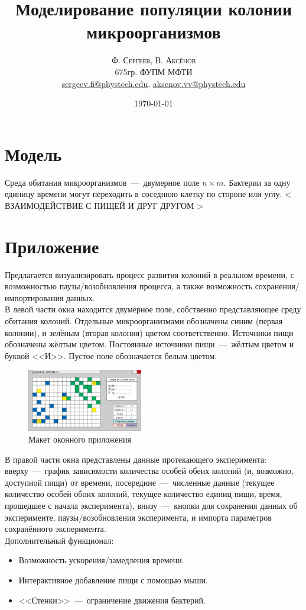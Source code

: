 \documentclass[11pt,twoside,twocolumn,russian,a4paper]{article}
\title{Моделирование популяции колонии микроорганизмов} %
\author{
	\textsc{Ф. Сергеев, В. Аксёнов} \\[0.5ex] %
	\normalsize 675гр. ФУПМ МФТИ \\ %
	\normalsize \href{mailto:sergeev.fi@phystech.edu}{sergeev.fi@phystech.edu}, \href{mailto:aksenov.vv@phystech.edu}{aksenov.vv@phystech.edu}	\normalsize 
}
\date{\today} %
\begin{document}
\maketitle


\section{Модель}

\noindent Среда обитания микроорганизмов~---~двумерное поле $n\times m$. Бактерии за одну единицу времени могут переходить в соседнюю клетку по стороне или углу.  <  ВЗАИМОДЕЙСТВИЕ С ПИЩЕЙ И ДРУГ ДРУГОМ >

\section{Приложение}

\noindent Предлагается визуализировать процесс развития колоний в реальном времени, с возможностью паузы/возобновления процесса, а также возможность сохранения/импортирования данных. \smallskip\\
\noindent В левой части окна находится двумерное поле, собственно представляющее среду обитания колоний. Отдельные микроорганизмами обозначены синим (первая колонии), и зелёным (вторая колония) цветом соответственно. Источники пищи обозначены жёлтым цветом. Постоянные источники пищи~---~жёлтым цветом и буквой <<И>>. Пустое поле обозначается белым цветом.\smallskip

\begin{figure}[h]
	\centering
	\includegraphics[width=0.45\textwidth]{scheme_big}
	\caption{Макет оконного приложения}
\end{figure}

\noindent В правой части окна представлены данные протекающего эксперимента: вверху~---~график зависимости количества особей обеих колоний (и, возможно, доступной пищи) от времени, посередине~---~численные данные (текущее количество особей обоих колоний, текущее количество единиц пищи, время, прошедшее с начала эксперимента), внизу~---~кнопки для сохранения данных об эксперименте, паузы/возобновления эксперимента, и импорта параметров сохранённого эксперимента.\smallskip\\
\noindent Дополнительный функционал:
\begin{itemize}
	\item Возможность ускорения/замедления времени.
	\item Интерактивное добавление пищи с помощью мыши.
	\item <<Стенки>>~---~ограничение движения бактерий.
\end{itemize}
\end{document}
